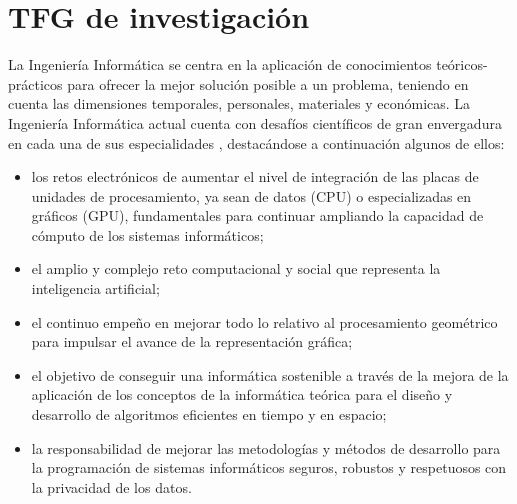 \section{TFG de investigación}
\label{appendix:investigacion}


La Ingeniería Informática se centra en la aplicación de conocimientos teóricos-prácticos para ofrecer la mejor solución posible a un problema, teniendo en cuenta las dimensiones temporales, personales, materiales y económicas. La Ingeniería Informática actual cuenta con desafíos científicos de gran envergadura en cada una de sus especialidades \cite{Zwart2022}, destacándose a continuación algunos de ellos:
\begin{itemize}
    \item los retos electrónicos de aumentar el nivel de integración de las placas de unidades de procesamiento, ya sean de datos (CPU) o especializadas en gráficos (GPU), fundamentales para continuar ampliando la capacidad de cómputo de los sistemas informáticos;
    \item el amplio y complejo reto computacional y social que representa la inteligencia artificial;
    \item el continuo empeño en mejorar todo lo relativo al procesamiento geométrico para impulsar el avance de la representación gráfica;
    \item el objetivo de conseguir una informática sostenible a través de la mejora de la aplicación de los conceptos de la informática teórica para el diseño y desarrollo de algoritmos eficientes en tiempo y en espacio;
    \item la responsabilidad de mejorar las metodologías y métodos de desarrollo para la programación de sistemas informáticos seguros, robustos y respetuosos con la privacidad de los datos.
\end{itemize}


